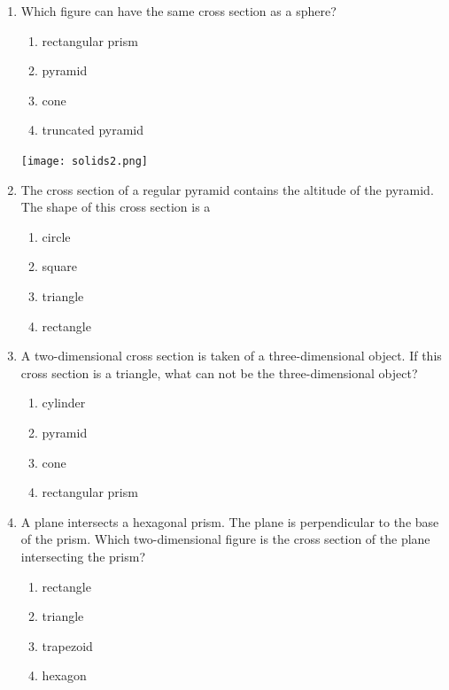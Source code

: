 \documentclass[12pt, twoside]{article}
\begin{document}
\begin{enumerate}
\newpage
  \item Which figure can have the same cross section as a sphere?
    \begin{multicols}{2}
      \begin{enumerate}
        \item rectangular prism
        \item pyramid
        \item cone
        \item truncated pyramid
      \end{enumerate}
    \texttt{[image: solids2.png]}
    \end{multicols}

  \item The cross section of a regular pyramid contains the altitude of the pyramid. The shape of this cross section is a
    \begin{multicols}{2}
      \begin{enumerate}
        \item circle
        \item square
        \item triangle
        \item rectangle
      \end{enumerate}
    \end{multicols}

  \item A two-dimensional cross section is taken of a three-dimensional object. If this cross section is a triangle, what can not be the three-dimensional object?
    \begin{multicols}{2}
      \begin{enumerate}
        \item cylinder
        \item pyramid
        \item cone
        \item rectangular prism
      \end{enumerate}
    \end{multicols}

  \item A plane intersects a hexagonal prism. The plane is perpendicular to the base of the prism. Which two-dimensional figure is the cross section of the plane intersecting the prism?
    \begin{multicols}{2}
      \begin{enumerate}
      \item rectangle
      \item triangle
      \item trapezoid
      \item hexagon
      \end{enumerate}
    \end{multicols}


\end{enumerate}
\end{document}
